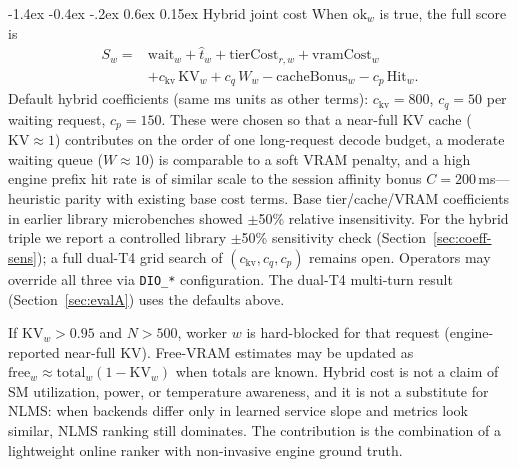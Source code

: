 \documentclass[pdflatex,sn-mathphys-num]{sn-jnl}
\makeatletter
\renewcommand{\subsection}{\@startsection{subsection}{2}{\z@}%
  {-1.4ex \@plus -0.4ex \@minus -.2ex}%
  {0.6ex \@plus 0.15ex}%
  {\needspace{3.5\baselineskip}\normalfont\normalsize\bfseries}}%
\makeatother
\begin{document}
\subsection{Hybrid joint cost}
When $\mathrm{ok}_w$ is true, the full score is
\begin{equation}
\begin{aligned}
S_w ={}& \mathrm{wait}_w + \hat{t}_w + \mathrm{tierCost}_{r,w} + \mathrm{vramCost}_w \\
&+ c_{\mathrm{kv}}\,\mathrm{KV}_w + c_{q}\,W_w
- \mathrm{cacheBonus}_w - c_{p}\,\mathrm{Hit}_w.
\end{aligned}
\label{eq:hybrid}
\end{equation}
Default hybrid coefficients (same ms units as other terms): $c_{\mathrm{kv}}{=}800$,
$c_{q}{=}50$ per waiting request, $c_{p}{=}150$. These were chosen so that a
near-full KV cache ($\mathrm{KV}{\approx}1$) contributes on the order of one
long-request decode budget, a moderate waiting queue ($W{\approx}10$) is
comparable to a soft VRAM penalty, and a high engine prefix hit rate is of similar
scale to the session affinity bonus $C{=}200$\,ms---heuristic parity with existing
base cost terms. Base tier/cache/VRAM coefficients in earlier library microbenches showed
$\pm$50\% relative insensitivity. For the hybrid triple we report a controlled
library $\pm$50\% sensitivity check (Section~\ref{sec:coeff-sens}); a full dual-T4
grid search of $(c_{\mathrm{kv}},c_q,c_p)$ remains open. Operators may override all
three via \texttt{DIO\_*} configuration. The dual-T4 multi-turn result
(Section~\ref{sec:evalA}) uses the defaults above.

If $\mathrm{KV}_w{>}0.95$ and $N{>}500$, worker $w$ is hard-blocked for that request
(engine-reported near-full KV). Free-VRAM estimates may be updated as
$\mathrm{free}_w \approx \mathrm{total}_w(1-\mathrm{KV}_w)$ when totals are known.
Hybrid cost is not a claim of SM utilization, power, or temperature awareness, and
it is not a substitute for NLMS: when backends differ only in learned service slope
and metrics look similar, NLMS ranking still dominates. The contribution is the
combination of a lightweight online ranker with non-invasive engine ground truth.
\end{document}
